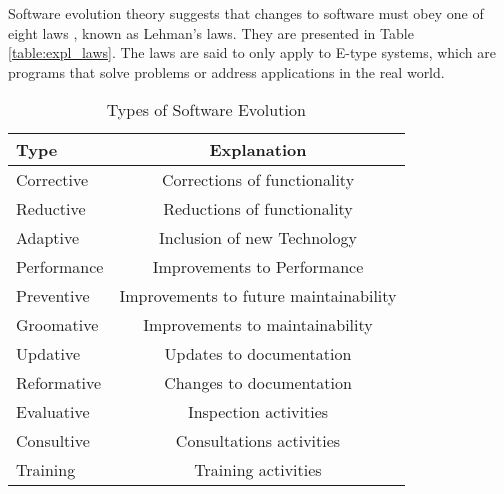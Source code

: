 \documentclass{sig-alternate}
\begin{document}
Software evolution theory suggests that changes to software must obey one of eight laws \cite{lehman90sview}, known as Lehman's laws. They are presented in Table \ref{table:expl_laws}. The laws are said to only apply to E-type systems, which are programs that solve problems or address applications in the real world.     



\begin{table}
       \centering
       \begin{tabular}[ht]{l|c}
              \toprule

              \textbf{Type}                              & \textbf{Explanation}    \\ \midrule
              Corrective    & Corrections of functionality                   \\ \hline
              Reductive     & Reductions of functionality                    \\ \hline
              Adaptive      & Inclusion of new Technology                    \\ \hline
              Performance   & Improvements to Performance                    \\ \hline
              Preventive    & Improvements to future maintainability         \\ \hline
              Groomative    & Improvements to maintainability                \\ \hline
              Updative      & Updates to documentation                       \\ \hline
              Reformative   & Changes to documentation                       \\ \hline
              Evaluative    & Inspection activities                          \\ \hline
              Consultive    & Consultations activities                       \\ \hline
              Training      & Training activities                            \\ 

              \bottomrule

       \end{tabular}
       \caption{Types of Software Evolution  \cite{chapin2001types}}
       \label{table:expl_types}
\end{table}
\end{document}
